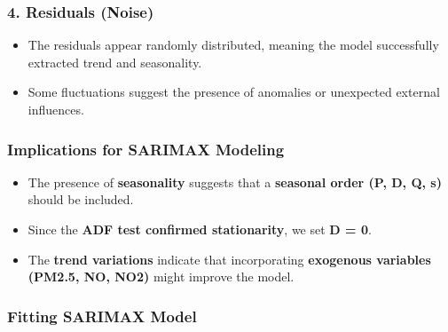 \documentclass[11pt]{article}
\providecommand{\tightlist}{%
      \setlength{\itemsep}{0pt}\setlength{\parskip}{0pt}}
\begin{document}
\hypertarget{residuals-noise}{%
\subsubsection{\texorpdfstring{4. \textbf{Residuals
(Noise)}}{4. Residuals (Noise)}}\label{residuals-noise}}

\begin{itemize}
\tightlist
\item
  The residuals appear randomly distributed, meaning the model
  successfully extracted trend and seasonality.
\item
  Some fluctuations suggest the presence of anomalies or unexpected
  external influences.
\end{itemize}

\hypertarget{implications-for-sarimax-modeling}{%
\subsubsection{\texorpdfstring{\textbf{Implications for SARIMAX
Modeling}}{Implications for SARIMAX Modeling}}\label{implications-for-sarimax-modeling}}

\begin{itemize}
\tightlist
\item
  The presence of \textbf{seasonality} suggests that a \textbf{seasonal
  order (P, D, Q, s)} should be included.
\item
  Since the \textbf{ADF test confirmed stationarity}, we set \textbf{D =
  0}.
\item
  The \textbf{trend variations} indicate that incorporating
  \textbf{exogenous variables (PM2.5, NO, NO2)} might improve the model.
\end{itemize}

    \hypertarget{fitting-sarimax-model}{%
\subsubsection{Fitting SARIMAX Model}\label{fitting-sarimax-model}}
\end{document}
